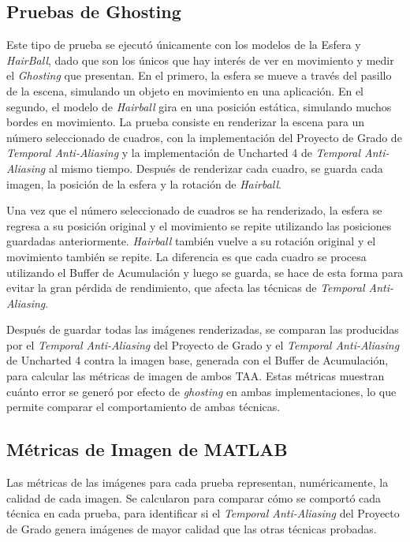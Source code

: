 \documentclass[pregrado]{tesis-usb} %
\begin{document}
\subsection{Pruebas de Ghosting}
Este tipo de prueba se ejecutó únicamente con los modelos de la Esfera y \textit{HairBall}, dado que son los únicos que hay interés de ver en movimiento y medir el \textit{Ghosting} que presentan. En el primero, la esfera se mueve a través del pasillo de la escena, simulando un objeto en movimiento en una aplicación. En el segundo, el modelo de \textit{Hairball} gira en una posición estática, simulando muchos bordes en movimiento. La prueba consiste en renderizar la escena para un número seleccionado de cuadros, con la implementación del Proyecto de Grado de \textit{Temporal Anti-Aliasing} y la implementación de Uncharted 4 de \textit{Temporal Anti-Aliasing} al mismo tiempo. Después de renderizar cada cuadro, se guarda cada imagen, la posición de la esfera y la rotación de \textit{Hairball}.

Una vez que el número seleccionado de cuadros se ha renderizado, la esfera se regresa a su posición original y el movimiento se repite utilizando las posiciones guardadas anteriormente. \textit{Hairball} también vuelve a su rotación original y el movimiento también se repite. La diferencia es que cada cuadro se procesa utilizando el Buffer de Acumulación y luego se guarda, se hace de esta forma para evitar la gran pérdida de rendimiento, que afecta las técnicas de \textit{Temporal Anti-Aliasing}.

Después de guardar todas las imágenes renderizadas, se comparan las producidas por el \textit{Temporal Anti-Aliasing} del Proyecto de Grado y el \textit{Temporal Anti-Aliasing} de Uncharted 4 contra la imagen base, generada con el Buffer de Acumulación, para calcular las métricas de imagen de ambos TAA. Estas métricas muestran cuánto error se generó por efecto de \textit{ghosting} en ambas implementaciones, lo que permite comparar el comportamiento de ambas técnicas. 


\subsection{Métricas de Imagen de MATLAB}
Las métricas de las imágenes para cada prueba representan, numéricamente, la calidad de cada imagen. Se calcularon para comparar cómo se comportó cada técnica en cada prueba, para identificar si el \textit{Temporal Anti-Aliasing} del Proyecto de Grado genera imágenes de mayor calidad que las otras técnicas probadas.
\end{document}
